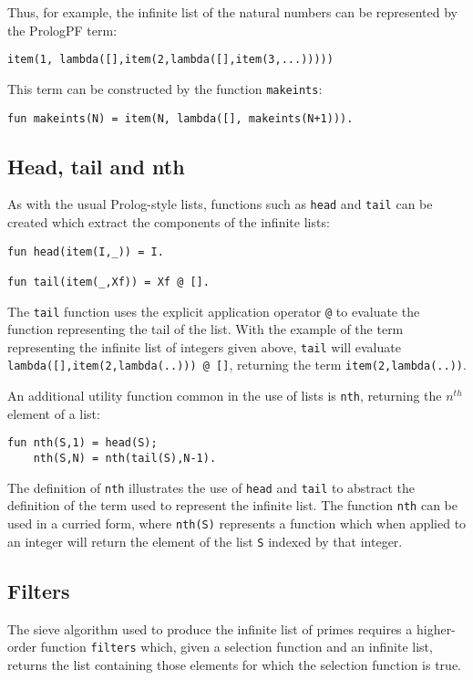 Thus, for example, the infinite list of the natural numbers can
be represented by the PrologPF term:\\
\centerline{\texttt{item(1, lambda([],item(2,lambda([],item(3,...))))) }}
This term can be constructed by the function \texttt{makeints}:
\begin{verbatim}
fun makeints(N) = item(N, lambda([], makeints(N+1))).
\end{verbatim}

\subsection{Head, tail and nth}

As with the usual Prolog-style lists, functions such as \texttt{head} and
\texttt{tail} can be created which extract the
components of the infinite lists:
\begin{verbatim}
fun head(item(I,_)) = I.

fun tail(item(_,Xf)) = Xf @ [].
\end{verbatim}
The \texttt{tail} function uses the explicit application operator \texttt{@} to
evaluate the function representing the tail of the list.  With the example
of the term representing the infinite list of integers given above, \texttt{tail}
will evaluate \texttt{lambda([],item(2,lambda(..))) @ []}, returning the term
\texttt{item(2,lambda(..))}.

An additional utility function common in the use of lists is \texttt{nth}, returning
the $n^{th}$ element of a list:
\begin{verbatim}
fun nth(S,1) = head(S);
    nth(S,N) = nth(tail(S),N-1).
\end{verbatim}
The definition of \texttt{nth} illustrates the use of \texttt{head} and \texttt{tail}
to abstract the definition of the term used to represent the infinite list.  The
function \texttt{nth} can be used in a curried form, where \texttt{nth(S)} represents
a function which when applied to an integer will return the element of the list \texttt{S}
indexed by that integer.

\subsection{Filters}

The sieve algorithm used to produce the infinite list of primes requires a 
higher-order function
\texttt{filters} which, given a selection function and an infinite list, returns
the list containing those elements for which the selection function is true.

